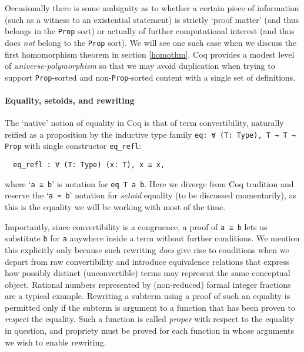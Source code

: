\documentclass[a4paper,10pt,runningheads]{llncs}
\begin{document}
Occasionally there is some ambiguity as to whether a certain piece of information (such as a witness to an existential statement) is strictly `proof matter' (and thus belongs in the \lstinline|Prop| sort) or actually of further computational interest (and thus does \emph{not} belong to the \lstinline|Prop| sort). We will see one such case when we discuss the first homomorphism theorem in section \ref{homothm}. Coq provides a modest level of \emph{universe-polymorphism} so that we may avoid duplication when trying to support \lstinline|Prop|-sorted and non-\lstinline|Prop|-sorted content with a single set of definitions.


\paragraph{Equality, setoids, and rewriting}

The `native' notion of equality in Coq is that of term convertibility, naturally reified as a proposition by the inductive type family \lstinline|eq: ∀ (T: Type), T → T → Prop| with single constructor \lstinline|eq_refl|:
\begin{lstlisting}
  eq_refl : ∀ (T: Type) (x: T), x ≡ x,
\end{lstlisting}
where `\lstinline|a ≡ b|' is notation for \lstinline|eq T a b|. Here we diverge from Coq tradition and reserve the `\lstinline|a = b|' notation for \emph{setoid} equality (to be discussed momentarily), as this is the equality we will be working with most of the time.

Importantly, since convertibility is a congruence, a proof of \lstinline|a ≡ b| lets us substitute \lstinline|b| for \lstinline|a| anywhere inside a term without further conditions. We mention this explicitly only because such rewriting \emph{does} give rise to conditions when we depart from raw convertibility and introduce equivalence relations that express how possibly distinct (unconvertible) terms may represent the same conceptual object. Rational numbers represented by (non-reduced) formal integer fractions are a typical example. Rewriting a subterm using a proof of such an equality is permitted only if the subterm is argument to a function that has been proven to \emph{respect} the equality. Such a function is called \emph{proper} with respect to the equality in question, and propriety must be proved for each function in whose arguments we wish to enable rewriting.
\end{document}
